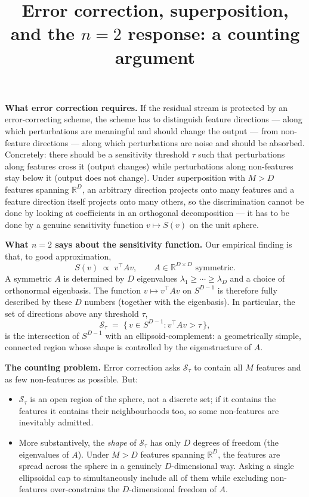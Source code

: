 \documentclass[11pt]{article}
\title{Error correction, superposition, and the $n=2$ response: a counting argument}
\date{}
\begin{document}
\maketitle

\noindent\textbf{What error correction requires.} If the residual stream is protected by an error-correcting scheme, the scheme has to distinguish feature directions --- along which perturbations are meaningful and should change the output --- from non-feature directions --- along which perturbations are noise and should be absorbed. Concretely: there should be a sensitivity threshold $\tau$ such that perturbations along features cross it (output changes) while perturbations along non-features stay below it (output does not change). Under superposition with $M > D$ features spanning $\mathbb{R}^D$, an arbitrary direction projects onto many features and a feature direction itself projects onto many others, so the discrimination cannot be done by looking at coefficients in an orthogonal decomposition --- it has to be done by a genuine sensitivity function $v \mapsto S(v)$ on the unit sphere.

\medskip
\noindent\textbf{What $n=2$ says about the sensitivity function.} Our empirical finding is that, to good approximation,
\[
S(v) \;\propto\; v^\top A v, \qquad A \in \mathbb{R}^{D\times D} \text{ symmetric.}
\]
A symmetric $A$ is determined by $D$ eigenvalues $\lambda_1 \geq \cdots \geq \lambda_D$ and a choice of orthonormal eigenbasis. The function $v \mapsto v^\top A v$ on $S^{D-1}$ is therefore fully described by these $D$ numbers (together with the eigenbasis). In particular, the set of directions above any threshold $\tau$,
\[
\mathcal{S}_\tau \;=\; \{\, v \in S^{D-1} : v^\top A v > \tau \,\},
\]
is the intersection of $S^{D-1}$ with an ellipsoid-complement: a geometrically simple, connected region whose shape is controlled by the eigenstructure of $A$.

\medskip
\noindent\textbf{The counting problem.} Error correction asks $\mathcal{S}_\tau$ to contain all $M$ features and as few non-features as possible. But:

\begin{itemize}
\item $\mathcal{S}_\tau$ is an open region of the sphere, not a discrete set; if it contains the features it contains their neighbourhoods too, so some non-features are inevitably admitted.
\item More substantively, the \emph{shape} of $\mathcal{S}_\tau$ has only $D$ degrees of freedom (the eigenvalues of $A$). Under $M > D$ features spanning $\mathbb{R}^D$, the features are spread across the sphere in a genuinely $D$-dimensional way. Asking a single ellipsoidal cap to simultaneously include all of them while excluding non-features over-constrains the $D$-dimensional freedom of $A$.
\end{itemize}
\end{document}
